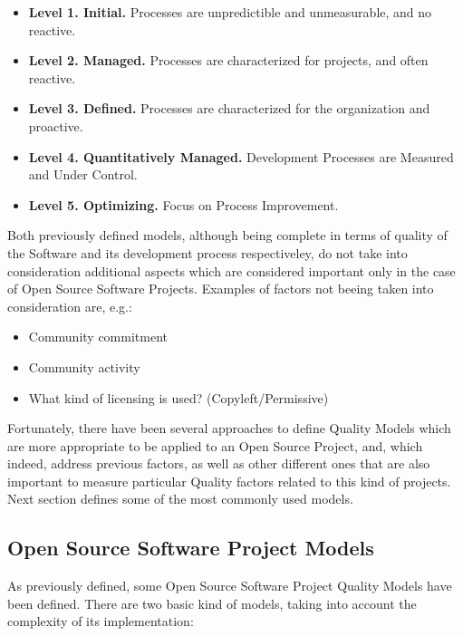 \documentclass[11pt]{article}
\begin{document}
\begin{itemize}\itemsep0pt
\item{\textbf{Level 1. Initial.}} Processes are unpredictible and unmeasurable, and no reactive.
\item{\textbf{Level 2. Managed.}} Processes are characterized for projects, and often reactive.
\item{\textbf{Level 3. Defined.}} Processes are characterized for the organization and proactive. 
\item{\textbf{Level 4. Quantitatively Managed.}} Development Processes are Measured and Under Control.
\item{\textbf{Level 5. Optimizing.}} Focus on Process Improvement.
\end{itemize}
Both previously defined models, although being complete in terms of quality of the Software and its development process respectiveley, do not take into consideration additional aspects which are considered important only in the case of Open Source Software Projects. Examples of factors not beeing taken into consideration are, e.g.:
\begin{itemize}\itemsep0pt
\item{Community commitment}
\item{Community activity}
\item{What kind of licensing is used? (Copyleft/Permissive)}
\end{itemize}
Fortunately, there have been several approaches to define Quality Models which are more appropriate to be applied to an Open Source Project, and, which indeed, address previous factors, as well as other different ones that are also important to measure particular Quality factors related to this kind of projects. Next section defines some of the most commonly used models.

\subsection{Open Source Software Project Models}

As previously defined, some Open Source Software Project Quality Models have been defined. There are two basic kind of models, taking into account the complexity of its implementation:
\end{document}
